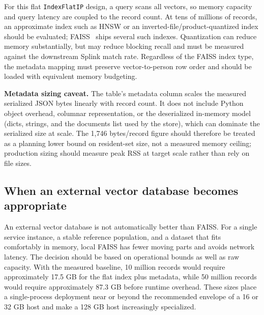 \documentclass[11pt]{article}
\begin{document}
For this flat \texttt{IndexFlatIP} design, a query scans all vectors, so memory capacity and query latency are coupled to the record count. At tens of millions of records, an approximate index such as HNSW or an inverted-file/product-quantized index should be evaluated; FAISS~\cite{johnson2019} ships several such indexes. Quantization can reduce memory substantially, but may reduce blocking recall and must be measured against the downstream Splink match rate. Regardless of the FAISS index type, the metadata mapping must preserve vector-to-person row order and should be loaded with equivalent memory budgeting.

\noindent
\textbf{Metadata sizing caveat.} The table's metadata column scales the measured serialized JSON bytes linearly with record count. It does not include Python object overhead, columnar representation, or the deserialized in-memory model (dicts, strings, and the documents list used by the store), which can dominate the serialized size at scale. The 1{,}746 bytes/record figure should therefore be treated as a planning lower bound on resident-set size, not a measured memory ceiling; production sizing should measure peak RSS at target scale rather than rely on file sizes.

\subsection{When an external vector database becomes appropriate}
An external vector database is not automatically better than FAISS. For a single service instance, a stable reference population, and a dataset that fits comfortably in memory, local FAISS has fewer moving parts and avoids network latency. The decision should be based on operational bounds as well as raw capacity. With the measured baseline, 10 million records would require approximately 17.5 GB for the flat index plus metadata, while 50 million records would require approximately 87.3 GB before runtime overhead. These sizes place a single-process deployment near or beyond the recommended envelope of a 16 or 32 GB host and make a 128 GB host increasingly specialized.
\end{document}
